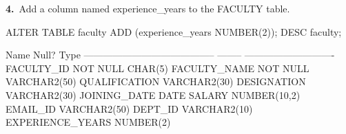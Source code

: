 
\noindent\begin{minipage}{\linewidth}
\begingroup{}
{\fontsize{14}{17}\selectfont\textbf{4.}}\ Add a column named experience\_years to the FACULTY table.\par
\endgroup\vspace{12pt}


\begin{sqlcode}
ALTER TABLE faculty ADD (experience_years NUMBER(2));
DESC faculty;
\end{sqlcode}

\vspace{18pt}


\begin{sqlout}
 Name                                      Null?    Type
 ----------------------------------------- -------- ----------------------------
 FACULTY_ID                                NOT NULL CHAR(5)
 FACULTY_NAME                              NOT NULL VARCHAR2(50)
 QUALIFICATION                                      VARCHAR2(30)
 DESIGNATION                                        VARCHAR2(30)
 JOINING_DATE                                       DATE
 SALARY                                             NUMBER(10,2)
 EMAIL_ID                                           VARCHAR2(50)
 DEPT_ID                                            VARCHAR2(10)
 EXPERIENCE_YEARS                                   NUMBER(2)
\end{sqlout}
\end{minipage}\par\vspace{30pt}

